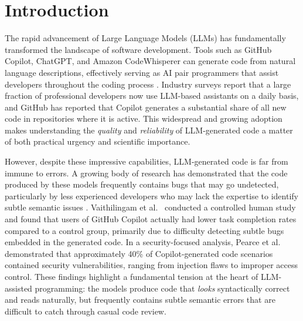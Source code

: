 \documentclass[smallextended]{svjour3}
\begin{document}
\section{Introduction}
\label{sec:introduction}

The rapid advancement of Large Language Models (LLMs) has fundamentally transformed the landscape of software development. Tools such as GitHub Copilot, ChatGPT, and Amazon CodeWhisperer can generate code from natural language descriptions, effectively serving as AI pair programmers that assist developers throughout the coding process \citep{chen2021evaluating, imai2022copilot}. Industry surveys report that a large fraction of professional developers now use LLM-based assistants on a daily basis, and GitHub has reported that Copilot generates a substantial share of all new code in repositories where it is active. This widespread and growing adoption makes understanding the \emph{quality} and \emph{reliability} of LLM-generated code a matter of both practical urgency and scientific importance.

However, despite these impressive capabilities, LLM-generated code is far from immune to errors. A growing body of research has demonstrated that the code produced by these models frequently contains bugs that may go undetected, particularly by less experienced developers who may lack the expertise to identify subtle semantic issues \citep{moradi2023copilot, pearce2022examining}. Vaithilingam et al.\ \citep{vaithilingam2022expectation} conducted a controlled human study and found that users of GitHub Copilot actually had lower task completion rates compared to a control group, primarily due to difficulty detecting subtle bugs embedded in the generated code. In a security-focused analysis, Pearce et al.\ \citep{pearce2022examining} demonstrated that approximately 40\% of Copilot-generated code scenarios contained security vulnerabilities, ranging from injection flaws to improper access control. These findings highlight a fundamental tension at the heart of LLM-assisted programming: the models produce code that \emph{looks} syntactically correct and reads naturally, but frequently contains subtle semantic errors that are difficult to catch through casual code review.
\end{document}

